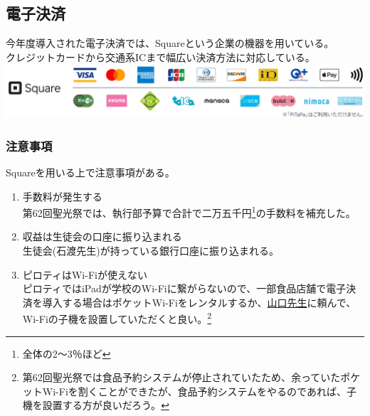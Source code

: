 \documentclass[dvipdfmx,jb5]{jarticle}
\newcommand{\mail}[2]{\href{mailto:#2}{#1}}
\begin{document}
 \subsection{電子決済}\label{sec:電子決済}
 今年度導入された電子決済では、Squareという企業の機器を用いている。\\
 クレジットカードから交通系ICまで幅広い決済方法に対応している。\\
 \includegraphics[scale=0.15]{assets/square_availability.png}
 \subsubsection{注意事項}
 Squareを用いる上で注意事項がある。
 \begin{enumerate}[注意1]
  \item 手数料が発生する\\
  第62回聖光祭では、執行部予算で合計で二万五千円\footnote{全体の2〜3％ほど}の手数料を補充した。
  \item 収益は生徒会の口座に振り込まれる\\
  生徒会(石渡先生)が持っている銀行口座に振り込まれる。
  \item ピロティはWi-Fiが使えない\\
  ピロティではiPadが学校のWi-Fiに繋がらないので、一部食品店舗で電子決済を導入する場合はポケットWi-Fiをレンタルするか、\mail{山口先生}{yuri.ayamguchi@seiko.ac.jp}に頼んで、Wi-Fiの子機を設置していただくと良い。\footnote{第62回聖光祭では食品予約システムが停止されていたため、余っていたポケットWi-Fiを割くことができたが、食品予約システムをやるのであれば、子機を設置する方が良いだろう。}
 \end{enumerate}
\end{document}
